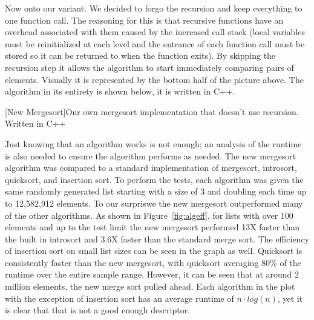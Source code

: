 \documentclass[12pt]{article}
\begin{document}
	Now onto our variant. 
	We decided to forgo the recursion and keep everything to one function call. 
	The reasoning for this is that recursive functions have an overhead associated with them caused by the increased call stack (local variables must be reinitialized at each level and the entrance of each function call must be stored so it can be returned to when the function exits). 
	By skipping the recursion step it allows the algorithm to start immediately comparing pairs of elements. 
	Visually it is represented by the bottom half of the picture above. 
	The algorithm in its entirety is shown below, it is written in C++.
	
	\begin{center}
		[New Mergesort]{Our own mergesort implementation that doesn't use recursion. Written in C++}
		
		\label{snip:newmerge}
	\end{center}

	Just knowing that an algorithm works is not enough; an analysis of the runtime is also needed to ensure the algorithm performs as needed. 
	The new mergesort algorithm was compared to a standard implementation of mergesort, introsort, quicksort, and insertion sort. 
	To perform the tests, each algorithm was given the same randomly generated list starting with a size of 3 and doubling each time up to 12,582,912 elements. 
	To our surpriswe the new mergesort outperformed many of the other algorithms. 
	As shown in Figure~\ref{fig:algeff}, for lists with over 100 elements and up to the test limit the new mergesort performed 13X faster than the built in introsort and 3.6X faster than the standard merge sort. 
	The efficiency of insertion sort on small list sizes can be seen in the graph as well. Quicksort is consistently faster than the new mergesort, with quicksort averaging 80\% of the runtime over the entire sample range. 
	However, it can be seen that at around 2 million elements, the new merge sort pulled ahead. 
	Each algorithm in the plot with the exception of insertion sort has an average runtime of $ n \cdot log (n) $, yet it is clear that that is not a good enough descriptor.
\end{document}

